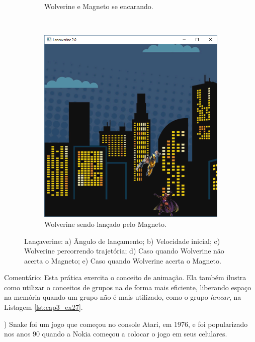 \begin{renumerate}
\begin{figure}[H]
\begin{subfigure}[t]{0.25\textwidth}
        \caption{Wolverine e Magneto se encarando.}
        \label{fig:cap03_ex27d}
    \end{subfigure}
    ~
    \begin{subfigure}[t]{0.25\textwidth}
        \centerline{\includegraphics[width=.9\textwidth]{img/cap3_ex27e}}
        \caption{Wolverine sendo lançado pelo Magneto.}
        \label{fig:cap03_ex27e}
    \end{subfigure}

    \caption{Lançaverine: a) Ângulo de lançamento; b) Velocidade inicial; c) Wolverine percorrendo trajetória; d) Caso quando Wolverine não acerta o Magneto; e) Caso quando Wolverine acerta o Magneto.}

  \end{figure}

  \label{ex:cap03_ex27} 
  Comentário: Esta prática exercita o conceito de animação. Ela também ilustra como utilizar o conceitos de grupos na \playAPC{} de forma mais eficiente, liberando espaço na memória quando um grupo não é mais utilizado, como o grupo \emph{lancar}, na Listagem \ref{lst:cap3_ex27}.
% 
  
\item)
Snake foi um jogo que começou no console Atari, em 1976, e foi popularizado nos anos 90 quando a Nokia começou a colocar o jogo em seus celulares. 
  

\end{renumerate}
